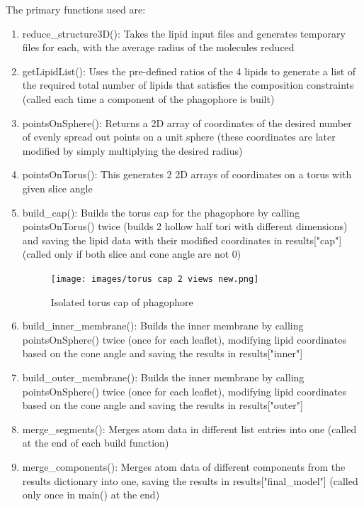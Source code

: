 \documentclass[12pt, a4paper]{report}
\begin{document}
The primary functions used are: 
\begin{enumerate}
    \item reduce\_structure3D(): Takes the lipid input files and generates temporary files for each, with the average radius of the molecules reduced
    \item getLipidList(): Uses the pre-defined ratios of the 4 lipids to generate a list of the required total number of lipids that satisfies the composition constraints (called each time a component of the phagophore is built) 
    \item pointsOnSphere(): Returns a 2D array of coordinates of the desired number of evenly spread out points on a unit sphere (these coordinates are later modified by simply multiplying the desired radius) 
    \item pointsOnTorus(): This generates 2 2D arrays of coordinates on a torus with given slice angle 
    \item build\_cap(): Builds the torus cap for the phagophore by calling pointsOnTorus() twice (builds 2 hollow half tori with different dimensions) and saving the lipid data with their modified coordinates in results["cap"] (called only if both slice and cone angle are not 0) 
    \begin{figure}[h]
    \texttt{[image: images/torus cap 2 views new.png]}
    \centering 
    \caption{Isolated torus cap of phagophore}
    \centering
\end{figure} 
    \item build\_inner\_membrane(): Builds the inner membrane by calling pointsOnSphere() twice (once for each leaflet), modifying lipid coordinates based on the cone angle and saving the results in results["inner"] 
    \item build\_outer\_membrane(): Builds the inner membrane by calling pointsOnSphere() twice (once for each leaflet), modifying lipid coordinates based on the cone angle and saving the results in results["outer"] 
    \item merge\_segments(): Merges atom data in different list entries into one (called at the end of each build function)
    \item merge\_components(): Merges atom data of different components from the results dictionary into one, saving the results in results["final\_model"] (called only once in main() at the end) 
\end{enumerate}
\end{document}
